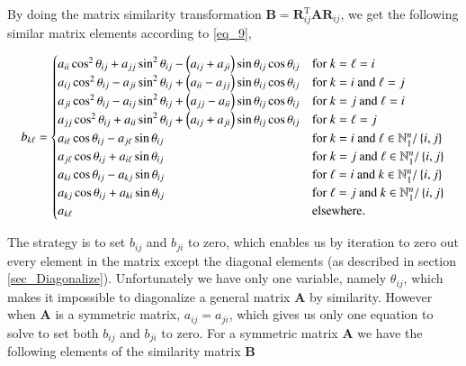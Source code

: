 \documentclass[11pt,english,a4paper]{article}
\begin{document}
\begin{flushleft}
By doing the matrix similarity transformation $\mathbf{B} = \mathbf{R}_{ij}^{\text{T}}\mathbf{A}\mathbf{R}_{ij}$, we get the following similar matrix elements according to \eqref{eq_9},

\begin{align*}
b_{k\ell} = \begin{cases} a_{ii} \cos^2\theta_{ij}  + a_{jj}\sin^2 \theta_{ij} - \left({a_{ij} + a_{ji}}\right)\sin\theta_{ij}\cos\theta_{ij} & \text{for $k=\ell=i$} \\ a_{ij}\cos^2\theta_{ij} - a_{ji}\sin^2\theta_{ij} + \left({a_{ii}-a_{jj}}\right)\sin\theta_{ij}\cos\theta_{ij} & \text{for $k=i$ and $\ell = j$} \\ a_{ji}\cos^2\theta_{ij} - a_{ij}\sin^2\theta_{ij} + \left({a_{jj}-a_{ii}}\right)\sin\theta_{ij}\cos\theta_{ij} & \text{for $k=j$ and $\ell=i$} \\ a_{jj} \cos^2\theta_{ij}  + a_{ii}\sin^2 \theta_{ij} + \left({a_{ij} + a_{ji}}\right)\sin\theta_{ij}\cos\theta_{ij} & \text{for $k=\ell=j$} \\ a_{i \ell} \cos\theta_{ij} -  a_{j\ell} \sin\theta_{ij} & \text{for $k=i$ and $\ell\in\mathbb{N}_1^n / \left\lbrace{i,j}\right\rbrace$} \\ a_{j\ell} \cos\theta_{ij} + a_{i\ell}\sin\theta_{ij} & \text{for $k=j$ and $\ell\in\mathbb{N}_1^n / \left\lbrace{i,j}\right\rbrace$} \\ a_{ki} \cos\theta_{ij} - a_{kj}\sin\theta_{ij} & \text{for $\ell=i$ and $k\in\mathbb{N}_1^n / \left\lbrace{i,j}\right\rbrace$} \\ a_{kj}\cos\theta_{ij} + a_{ki}\sin\theta_{ij} & \text{for $\ell=j$ and $k\in\mathbb{N}_1^n / \left\lbrace{i,j}\right\rbrace$} \\ a_{k\ell} & \text{elsewhere.}\end{cases}
\end{align*}

The strategy is to set $b_{ij}$ and $b_{ji}$ to zero, which enables us by iteration to zero out every element in the matrix except the diagonal elements (as described in section \ref{sec_Diagonalize}). Unfortunately we have only one variable, namely $\theta_{ij}$, which makes it impossible to diagonalize a general matrix $\mathbf{A}$ by similarity. However when $\mathbf{A}$ is a symmetric matrix, $a_{ij}=a_{ji}$, which gives us only one equation to solve to set both $b_{ij}$ and $b_{ji}$ to zero. For a symmetric matrix $\mathbf{A}$ we have the following elements of the similarity matrix $\mathbf{B}$


\end{flushleft}
\end{document}
